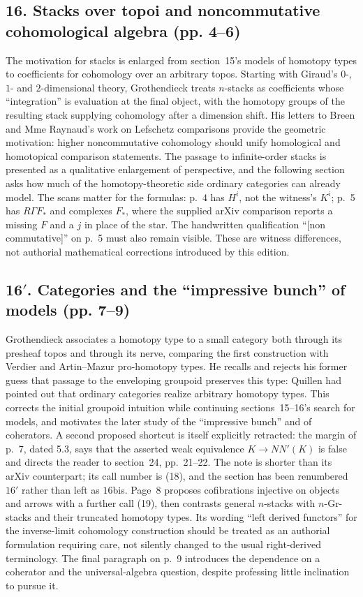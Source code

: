 \subsection*{16. Stacks over topoi and noncommutative cohomological algebra (pp. 4--6)}
The motivation for stacks is enlarged from section~15's models of homotopy types to coefficients for cohomology over an arbitrary topos. Starting with Giraud's $0$-, $1$- and $2$-dimensional theory, Grothendieck treats $n$-stacks as coefficients whose ``integration'' is evaluation at the final object, with the homotopy groups of the resulting stack supplying cohomology after a dimension shift. His letters to Breen and Mme Raynaud's work on Lefschetz comparisons provide the geometric motivation: higher noncommutative cohomology should unify homological and homotopical comparison statements. The passage to infinite-order stacks is presented as a qualitative enlargement of perspective, and the following section asks how much of the homotopy-theoretic side ordinary categories can already model. The scans matter for the formulas: p.~4 has $H^i$, not the witness's $K^i$; p.~5 has $R\Gamma F_*$ and complexes $F_*$, where the supplied arXiv comparison reports a missing $F$ and a $j$ in place of the star. The handwritten qualification ``[non commutative]'' on p.~5 must also remain visible. These are witness differences, not authorial mathematical corrections introduced by this edition.

\subsection*{16$'$. Categories and the ``impressive bunch'' of models (pp. 7--9)}
Grothendieck associates a homotopy type to a small category both through its presheaf topos and through its nerve, comparing the first construction with Verdier and Artin--Mazur pro-homotopy types. He recalls and rejects his former guess that passage to the enveloping groupoid preserves this type: Quillen had pointed out that ordinary categories realize arbitrary homotopy types. This corrects the initial groupoid intuition while continuing sections~15--16's search for models, and motivates the later study of the ``impressive bunch'' and of coherators. A second proposed shortcut is itself explicitly retracted: the margin of p.~7, dated 5.3, says that the asserted weak equivalence $K\longrightarrow NN'(K)$ is false and directs the reader to section~24, pp.~21--22. The note is shorter than its arXiv counterpart; its call number is (18), and the section has been renumbered $16'$ rather than left as $16$bis. Page~8 proposes cofibrations injective on objects and arrows with a further call (19), then contrasts general $n$-stacks with $n$-Gr-stacks and their truncated homotopy types. Its wording ``left derived functors'' for the inverse-limit cohomology construction should be treated as an authorial formulation requiring care, not silently changed to the usual right-derived terminology. The final paragraph on p.~9 introduces the dependence on a coherator and the universal-algebra question, despite professing little inclination to pursue it.

